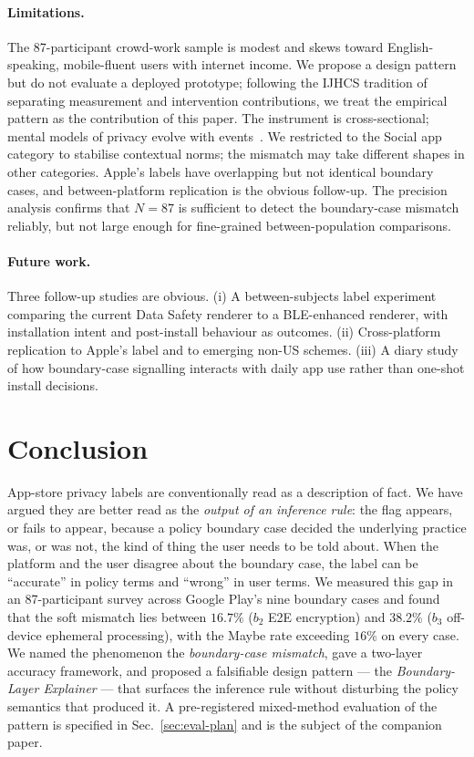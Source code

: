 \documentclass[11pt,a4paper]{article}
\makeatletter
\let\@oldsection\section
\renewcommand{\section}{\FloatBarrier\@oldsection}
\makeatother
\begin{document}
\paragraph{Limitations.}
The 87-participant crowd-work sample is modest and skews toward
English-speaking, mobile-fluent users with internet income. We
propose a design pattern but do not evaluate a deployed prototype;
following the IJHCS tradition of separating measurement and
intervention contributions, we treat the empirical pattern as the
contribution of this paper. The instrument is cross-sectional;
mental models of privacy evolve with
events~\citep{rader:etal:2012,wash:rader:2015,sannon:etal:2018}. We
restricted to the Social app category to stabilise contextual norms;
the mismatch may take different shapes in other categories. Apple's
labels have overlapping but not identical boundary cases, and
between-platform replication is the obvious follow-up. The precision
analysis confirms that $N{=}87$ is sufficient to detect the
boundary-case mismatch reliably, but not large enough for
fine-grained between-population comparisons.

\paragraph{Future work.}
Three follow-up studies are obvious. (i) A between-subjects label
experiment comparing the current Data Safety renderer to a
BLE-enhanced renderer, with installation intent and post-install
behaviour as outcomes. (ii) Cross-platform replication to Apple's
label and to emerging non-US schemes. (iii) A diary study of how
boundary-case signalling interacts with daily app use rather than
one-shot install decisions.

\section{Conclusion}\label{sec:conclusion}

App-store privacy labels are conventionally read as a description of
fact. We have argued they are better read as the \emph{output of an
inference rule}: the flag appears, or fails to appear, because a
policy boundary case decided the underlying practice was, or was
not, the kind of thing the user needs to be told about. When the
platform and the user disagree about the boundary case, the label
can be ``accurate'' in policy terms and ``wrong'' in user terms. We
measured this gap in an 87-participant survey across Google Play's
nine boundary cases and found that the soft mismatch lies between
$16.7\%$ ($b_2$ E2E encryption) and $38.2\%$ ($b_3$ off-device
ephemeral processing), with the Maybe rate exceeding $16\%$ on
every case. We named the phenomenon the \emph{boundary-case
mismatch}, gave a two-layer accuracy framework, and proposed a
falsifiable design pattern --- the \emph{Boundary-Layer Explainer}
--- that surfaces the inference rule without disturbing the policy
semantics that produced it. A pre-registered mixed-method
evaluation of the pattern is specified in Sec.~\ref{sec:eval-plan}
and is the subject of the companion paper.
\end{document}

